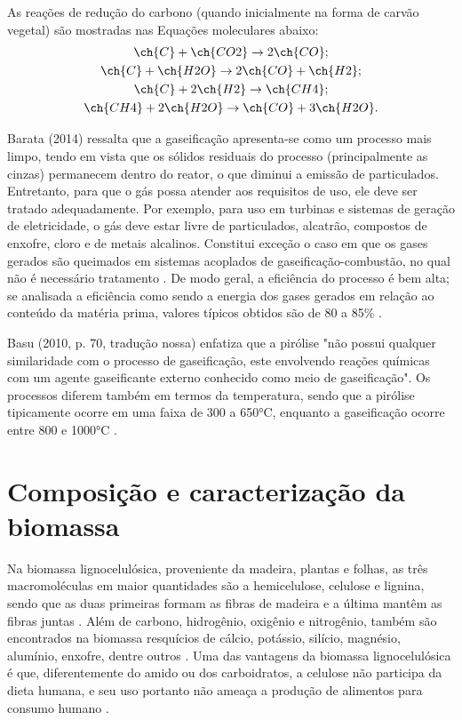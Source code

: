 As reações de redução do carbono (quando inicialmente na forma de carvão vegetal) são mostradas nas Equações moleculares abaixo:
\begin{gather} 
	\ch{C} + \ch{CO2} \rightarrow{} 2\ch{CO}   \label{eq:gas1};  \\
	\ch{C} + \ch{H2O} \rightarrow{} 2\ch{CO} + \ch{H2} \label{eq:gas2}; \\
	\ch{C} + 2\ch{H2} \rightarrow{} \ch{CH4} \label{eq:gas3}; \\
	\ch{CH4} + 2\ch{H2O} \rightarrow{} \ch{CO} + 3\ch{H2O} \label{eq:gas4}.
\end{gather}

Barata (2014) ressalta que a gaseificação apresenta-se como um processo mais limpo, tendo em vista que os sólidos residuais do processo (principalmente as cinzas) permanecem dentro do reator, o que diminui a emissão de particulados. Entretanto, para que o gás possa atender aos requisitos de uso, ele deve ser tratado adequadamente. Por exemplo, para uso em turbinas e sistemas de geração de eletricidade, o gás deve estar livre de particulados, alcatrão, compostos de enxofre, cloro e de metais alcalinos. Constitui exceção o caso em que os gases gerados são queimados em sistemas acoplados de gaseificação-combustão, no qual não é necessário tratamento \cite{Brand}. De modo geral, a eficiência do processo é bem alta; se analisada a eficiência como sendo a energia dos gases gerados em relação ao conteúdo da matéria prima, valores típicos obtidos são de 80 a 85\% \cite{Brand}.

Basu (2010, p. 70, tradução nossa) enfatiza que a pirólise "não possui qualquer similaridade com o processo de gaseificação, este envolvendo reações químicas com um agente gaseificante externo conhecido como meio de gaseificação". Os processos diferem também em termos da temperatura, sendo que a pirólise tipicamente ocorre em uma faixa de 300 a 650°C, enquanto a gaseificação ocorre entre 800 e 1000°C \cite{Basu}.

\section{Composição e caracterização da biomassa}
Na biomassa lignocelulósica, proveniente da madeira, plantas e folhas, as três macromoléculas em maior quantidades são a hemicelulose, celulose e lignina, sendo que as duas primeiras formam as fibras de madeira e a última mantêm as fibras juntas \cite{Amazonia}. Além de carbono, hidrogênio, oxigênio e nitrogênio, também são encontrados na biomassa resquícios de cálcio, potássio, silício, magnésio, alumínio, enxofre, dentre outros \cite{Febrero2015}. Uma das vantagens da biomassa lignocelulósica é que, diferentemente do amido ou dos carboidratos, a celulose não participa da dieta humana, e seu uso portanto não ameaça a produção de alimentos para consumo humano \cite{Basu}.

